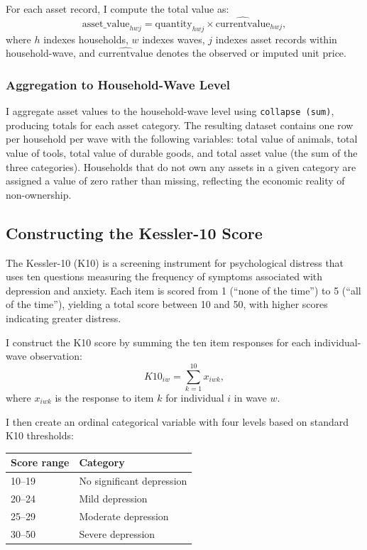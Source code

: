 \documentclass[12pt]{article}
\begin{document}
For each asset record, I compute the total value as:
\begin{equation}
\text{asset\_value}_{hwj} = \text{quantity}_{hwj} \times \widehat{\text{currentvalue}}_{hwj},
\end{equation}
where $h$ indexes households, $w$ indexes waves, $j$ indexes asset records within household-wave, and $\widehat{\text{currentvalue}}$ denotes the observed or imputed unit price.


\subsubsection{Aggregation to Household-Wave Level}

I aggregate asset values to the household-wave level using \texttt{collapse (sum)}, producing totals for each asset category. The resulting dataset contains one row per household per wave with the following variables: total value of animals, total value of tools, total value of durable goods, and total asset value (the sum of the three categories). Households that do not own any assets in a given category are assigned a value of zero rather than missing, reflecting the economic reality of non-ownership.


\subsection{Constructing the Kessler-10 Score}

The Kessler-10 (K10) is a screening instrument for psychological distress that uses ten questions measuring the frequency of symptoms associated with depression and anxiety. Each item is scored from 1 (``none of the time'') to 5 (``all of the time''), yielding a total score between 10 and 50, with higher scores indicating greater distress.

I construct the K10 score by summing the ten item responses for each individual-wave observation:
\begin{equation}
K10_{iw} = \sum_{k=1}^{10} x_{iwk},
\end{equation}
where $x_{iwk}$ is the response to item $k$ for individual $i$ in wave $w$.

I then create an ordinal categorical variable with four levels based on standard K10 thresholds:
\begin{center}
\begin{tabular}{ll}
\toprule
Score range & Category \\
\midrule
10--19 & No significant depression \\
20--24 & Mild depression \\
25--29 & Moderate depression \\
30--50 & Severe depression \\
\bottomrule
\end{tabular}
\end{center}
\end{document}
